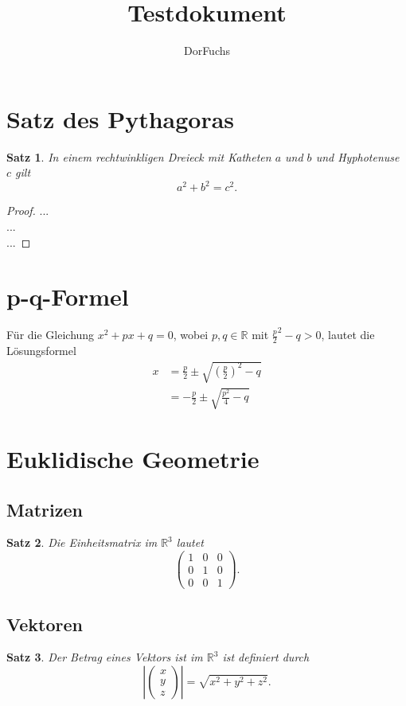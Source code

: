 \documentclass{article}
\newtheorem{satz}{Satz}
\newcommand{\R}{\mathbb{R}}
\newcommand{\vektor}[1]{\begin{pmatrix}#1\end{pmatrix}}
\begin{document}
	

\title{Testdokument}
\author{DorFuchs}
\maketitle
	

\tableofcontents

\newpage


\section{Satz des Pythagoras}
	
\begin{satz}
	In einem rechtwinkligen Dreieck mit Katheten $a$ und $b$ und Hyphotenuse $c$ gilt
	\[ a^2 + b^2 = c^2 . \]
\end{satz}
\begin{proof}
	... \\
	... \\
	...
\end{proof}


\section{p-q-Formel}

Für die Gleichung $x^2 + px + q = 0$, wobei $p, q \in \mathbb{R}$ mit $\frac{p}{2}^2 - q > 0$, lautet die Lösungsformel
\begin{align}
	x &= \frac{p}{2} \pm \sqrt{ \left( \frac{p}{2} \right)^2 - q} \\
	&= - \frac{p}{2} \pm \sqrt{\frac{p^2}{4} - q}
\end{align}


\section{Euklidische Geometrie}

\subsection{Matrizen}

\begin{satz}
	Die Einheitsmatrix im $\R^3$ lautet
	\[ \begin{pmatrix}
	1 & 0 & 0 \\
	0 & 1 & 0 \\
	0 & 0 & 1
	\end{pmatrix} . \]
\end{satz}

\subsection{Vektoren}

\begin{satz}
	Der Betrag eines Vektors ist im $\R^3$ ist definiert durch
	\[ \left| \vektor{x\\y\\z} \right| = \sqrt{x^2 + y^2 + z^2} . \]
\end{satz}
\end{document}
